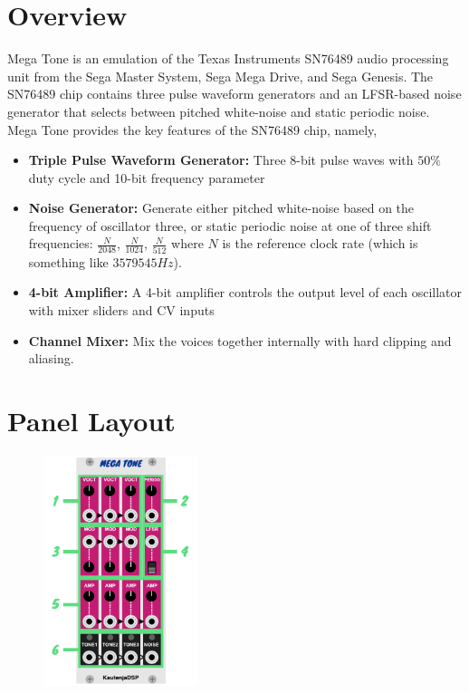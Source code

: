 \documentclass[12pt,letter]{article}
\begin{document}


\section*{Overview}

Mega Tone is an emulation of the Texas Instruments SN76489 audio processing unit from the Sega Master System, Sega Mega Drive, and Sega Genesis. The SN76489 chip contains three pulse waveform generators and an LFSR-based noise generator that selects between pitched white-noise and static periodic noise. Mega Tone provides the key features of the SN76489 chip, namely,
\begin{itemize}
  \item \textbf{Triple Pulse Waveform Generator:} Three 8-bit pulse waves with $50\%$ duty cycle and 10-bit frequency parameter
  \item \textbf{Noise Generator:} Generate either pitched white-noise based on the frequency of oscillator three, or static periodic noise at one of three shift frequencies: $\frac{N}{2048}$, $\frac{N}{1024}$, $\frac{N}{512}$ where $N$ is the reference clock rate (which is something like $3579545Hz$).
  \item \textbf{4-bit Amplifier:} A 4-bit amplifier controls the output level of each oscillator with mixer sliders and CV inputs
  \item \textbf{Channel Mixer:} Mix the voices together internally with hard clipping and aliasing.
\end{itemize}


\clearpage
\section*{Panel Layout}

\begin{figure}[!htp]
\centering
\includegraphics[width=0.4\textwidth]{Interface}
\end{figure}
\end{document}
